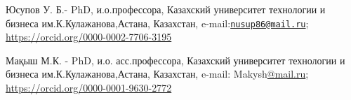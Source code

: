 \begin{authorinfo}
Юсупов У. Б.- PhD, и.о.профессора, Казахский университет технологии и
бизнеса им.К.Кулажанова,Астана, Казахстан,
e-mail:\href{mailto:nusup86@mail.ru}{\nolinkurl{nusup86@mail.ru}};
\href{https://orcid.org/0000-0002-7706-3195}{https://orcid.org/0000-0002-7706-3195}

Мақыш М.К. - PhD, и.о. асс.профессора, Казахский университет технологии
и бизнеса им.К.Кулажанова,Астана, Казахстан, e-mail:
Makysh\href{mailto:bayana_7778@mail.ru}{@mail.ru};
\href{https://orcid.org/0000-0001-9630-2772}{https://orcid.org/0000-0001-9630-2772}
\end{authorinfo}
